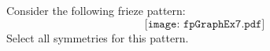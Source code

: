 \documentclass{ximera}
\author{Bart Snapp}
\begin{document}
\begin{exercise}
  Consider the following frieze pattern:
  \[
  \texttt{[image: fpGraphEx7.pdf]}
  \]
  Select all symmetries for this pattern.
  \begin{selectAll}
  \end{selectAll}
\end{exercise}
\end{document}
